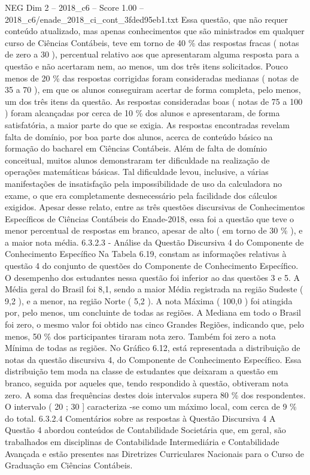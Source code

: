 \begin{textsample}{NEG Dim 2 – 2018\_c6 – Score 1.00 – 2018\_c6/enade\_2018\_ci\_cont\_3fded95eb1.txt}
Essa questão, que não requer conteúdo atualizado, mas apenas conhecimentos que são ministrados em qualquer curso de Ciências Contábeis, teve em torno de 40 \% das respostas fracas ( notas de zero a 30 ), percentual relativo aos que apresentaram alguma resposta para a questão e não acertaram nem, ao menos, um dos três itens solicitados.
Pouco menos de 20 \% das respostas corrigidas foram consideradas medianas ( notas de 35 a 70 ), em que os alunos conseguiram acertar de forma completa, pelo menos, um dos três itens da questão.
As respostas consideradas boas ( notas de 75 a 100 ) foram alcançadas por cerca de 10 \% dos alunos e apresentaram, de forma satisfatória, a maior parte do que se exigia.
As respostas encontradas revelam falta de domínio, por boa parte dos alunos, acerca de conteúdo básico na formação do bacharel em Ciências Contábeis.
Além de falta de domínio conceitual, muitos alunos demonstraram ter dificuldade na realização de operações matemáticas básicas.
Tal dificuldade levou, inclusive, a várias manifestações de insatisfação pela impossibilidade de uso da calculadora no exame, o que era completamente desnecessário pela facilidade dos cálculos exigidos.
Apesar desse relato, entre as três questões discursivas de Conhecimentos Específicos de Ciências Contábeis do Enade-2018, essa foi a questão que teve o menor percentual de respostas em branco, apesar de alto ( em torno de 30 \% ), e a maior nota média. 6.3.2.3 - Análise da Questão Discursiva 4 do Componente de Conhecimento Específico Na Tabela 6.19, constam as informações relativas à questão 4 do conjunto de questões do Componente de Conhecimento Específico.
O desempenho dos estudantes nessa questão foi inferior ao das questões 3 e 5.
A Média geral do Brasil foi 8,1, sendo a maior Média registrada na região Sudeste ( 9,2 ), e a menor, na região Norte ( 5,2 ).
A nota Máxima ( 100,0 ) foi atingida por, pelo menos, um concluinte de todas as regiões.
A Mediana em todo o Brasil foi zero, o mesmo valor foi obtido nas cinco Grandes Regiões, indicando que, pelo menos, 50 \% dos participantes tiraram nota zero.
Também foi zero a nota Mínima de todas as regiões.
No Gráfico 6.12, está representada a distribuição de notas da questão discursiva 4, do Componente de Conhecimento Específico.
Essa distribuição tem moda na classe de estudantes que deixaram a questão em branco, seguida por aqueles que, tendo respondido à questão, obtiveram nota zero.
A soma das frequências destes dois intervalos supera 80 \% dos respondentes.
O intervalo ( 20 ; 30 ] caracteriza -se como um máximo local, com cerca de 9 \% do total. 6.3.2.4 Comentários sobre as respostas à Questão Discursiva 4 A Questão 4 abordou conteúdos de Contabilidade Societária que, em geral, são trabalhados em disciplinas de Contabilidade Intermediária e Contabilidade Avançada e estão presentes nas Diretrizes Curriculares Nacionais para o Curso de Graduação em Ciências Contábeis.

\end{textsample}

